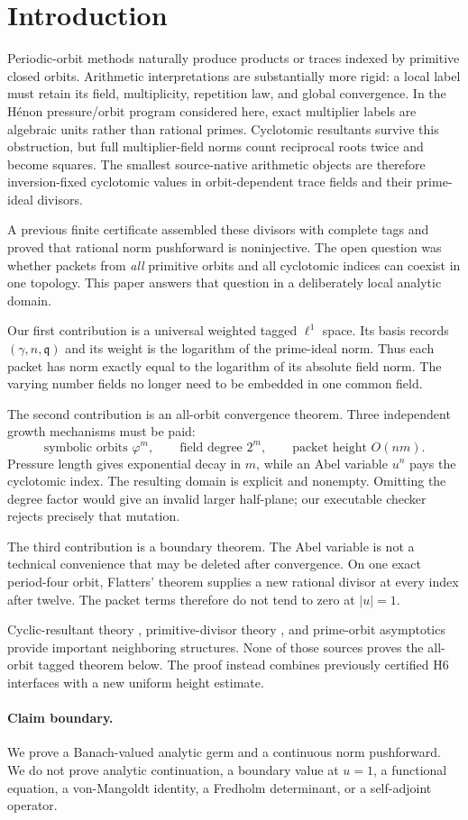 \section{Introduction}

Periodic-orbit methods naturally produce products or traces indexed by
primitive closed orbits.  Arithmetic interpretations are substantially more
rigid: a local label must retain its field, multiplicity, repetition law,
and global convergence.  In the H\'enon pressure/orbit program considered
here, exact multiplier labels are algebraic units rather than rational
primes.  Cyclotomic resultants survive this obstruction, but full
multiplier-field norms count reciprocal roots twice and become squares.
The smallest source-native arithmetic objects are therefore
inversion-fixed cyclotomic values in orbit-dependent trace fields and their
prime-ideal divisors.

A previous finite certificate assembled these divisors with complete tags
and proved that rational norm pushforward is noninjective.  The open
question was whether packets from \emph{all} primitive orbits and all
cyclotomic indices can coexist in one topology.  This paper answers that
question in a deliberately local analytic domain.

Our first contribution is a universal weighted tagged $\ell^1$ space.  Its
basis records $(\gamma,n,\mathfrak q)$ and its weight is the logarithm of
the prime-ideal norm.  Thus each packet has norm exactly equal to the
logarithm of its absolute field norm.  The varying number fields no longer
need to be embedded in one common field.

The second contribution is an all-orbit convergence theorem.  Three
independent growth mechanisms must be paid:
\[
\text{symbolic orbits } \varphi^m,\qquad
\text{field degree }2^m,\qquad
\text{packet height }O(nm).
\]
Pressure length gives exponential decay in $m$, while an Abel variable
$u^n$ pays the cyclotomic index.  The resulting domain is explicit and
nonempty.  Omitting the degree factor would give an invalid larger
half-plane; our executable checker rejects precisely that mutation.

The third contribution is a boundary theorem.  The Abel variable is not a
technical convenience that may be deleted after convergence.  On one exact
period-four orbit, Flatters' theorem \cite{flatters2009} supplies a new
rational divisor at every index after twelve.  The packet terms therefore
do not tend to zero at $|u|=1$.

Cyclic-resultant theory \cite{hillar2005}, primitive-divisor theory
\cite{flatters2009,bhv2001}, and prime-orbit asymptotics
\cite{parrypollicott1983} provide important neighboring structures.  None
of those sources proves the all-orbit tagged theorem below.  The proof
instead combines previously certified H6 interfaces with a new uniform
height estimate.

\paragraph{Claim boundary.}
We prove a Banach-valued analytic germ and a continuous norm pushforward.
We do not prove analytic continuation, a boundary value at $u=1$, a
functional equation, a von-Mangoldt identity, a Fredholm determinant, or a
self-adjoint operator.
